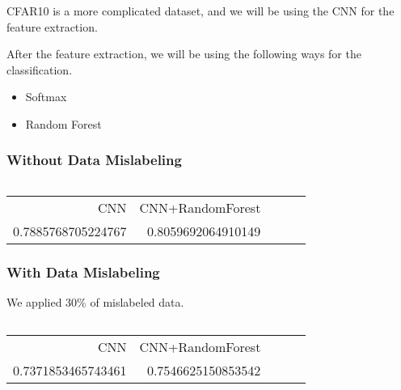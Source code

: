 \documentclass{article}
\begin{document}
CFAR10 is a more complicated dataset, and we will be using the CNN for the feature extraction. 

After the feature extraction, we will be using the following ways for the classification. 
\begin{itemize}
    \item Softmax
    \item Random Forest
\end{itemize}

\subsubsection{Without Data Mislabeling}

\inputminted[frame=single,framesep=10pt]{python}{cifar10/main.py}

\begin{table}[H]
    \centering
    \begin{tabular}{rrrrr}
        CNN &  CNN+RandomForest   \\
        0.7885768705224767 &       0.8059692064910149  \\
    \end{tabular}
\end{table}

\subsubsection{With Data Mislabeling}

We applied 30\% of mislabeled data. 

\inputminted[firstline=32,lastline=54,frame=single,framesep=10pt]{python}{cifar10-mislabeled/main.py}


\begin{table}[H]
    \centering
    \begin{tabular}{rrrrr}
        CNN &  CNN+RandomForest   \\
        0.7371853465743461 &       0.7546625150853542  \\
    \end{tabular}
\end{table}
\end{document}
